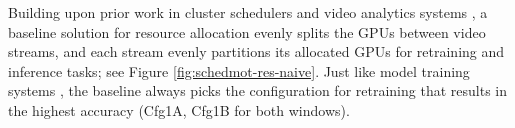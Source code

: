 


 Building upon prior work in cluster schedulers \cite{fair-1, fair-2} and video analytics systems \cite{videostorm}, a baseline solution for resource allocation evenly splits the GPUs between video streams, and each stream evenly partitions its allocated GPUs for retraining and inference tasks; see Figure \ref{fig:schedmot-res-naive}. Just like model training systems \cite{vizier,hyperband,pbt}, the baseline always picks the configuration for retraining that results in the highest accuracy ({Cfg1A, Cfg1B} for both windows).


